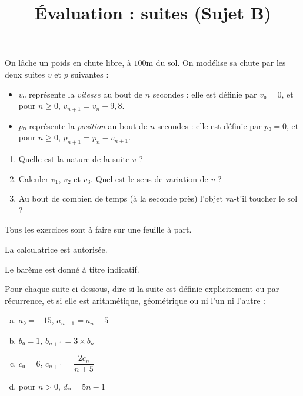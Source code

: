 \documentclass[
	classe=$1^{ere}STI2D$
]{évaluation}
\begin{document}
\begin{exercice}[4]
	On lâche un poids en chute libre, à $100$m du sol. On modélise sa chute par les deux suites $v$ et $p$ suivantes :

	\begin{itemize}
		\item $vₙ$ représente la \textit{vitesse} au bout de $n$ secondes : elle est définie par $v₀ = 0$, et pour $n ≥ 0$, $v_{n+1} = v_n - 9,8$.
		\item $pₙ$ représente la \textit{position} au bout de $n$ secondes : elle est définie par $p₀ = 0$, et pour $n ≥ 0$, $p_{n+1} = p_n - v_{n+1}$.
	\end{itemize}

	\begin{enumerate}
		\item Quelle est la nature de la suite $v$ ?
		\item Calculer $v_1$, $v_2$ et $v_3$. Quel est le sens de variation de $v$ ?
		\item Au bout de combien de temps (à la seconde près) l'objet va-t'il toucher le sol ?
	\end{enumerate}
\end{exercice}

\newpage
\setcounter{exercice}{1}

\title{Évaluation : suites (Sujet B)}
\maketitle

\begin{tcolorbox}
	Tous les exercices sont à faire sur une feuille à part.

	La calculatrice est autorisée.

	Le barème est donné à titre indicatif.
\end{tcolorbox}

\begin{exercice}[4]
	Pour chaque suite ci-dessous, dire si la suite est définie explicitement ou par récurrence, et si elle est arithmétique, géométrique ou ni l'un ni l'autre :
	\begin{multicols}{2}
		\begin{enumerate}[a)]
			\item $a₀ = -15$, $a_{n+1} = a_n - 5$
			\item $b₀ = 1$, $b_{n+1} = 3 × b_n$
			      \columnbreak
			\item $c₀ = 6$, $c_{n+1} = \dfrac{2c_n}{n + 5}$
			\item pour $n > 0$, $dₙ = 5n - 1$
		\end{enumerate}
	\end{multicols}
\end{exercice}
\end{document}
